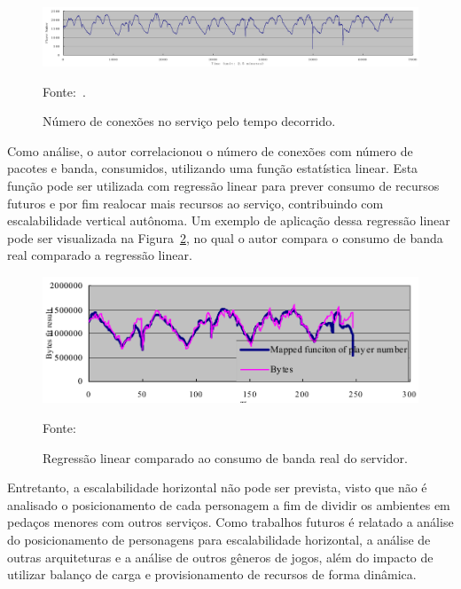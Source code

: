 \begin{figure}[htb!]
\caption{Número de conexões no serviço pelo tempo decorrido.}
\label{fig:players_peer_time}
\includegraphics[width=\textwidth]{img/cap2/players_peer_time.png}
\centering

Fonte:~\cite{1417630}.
\end{figure}



Como análise, o autor correlacionou o número de conexões com número de pacotes e banda, consumidos, utilizando uma função estatística linear.
%
Esta função pode ser utilizada com regressão linear para prever consumo de recursos futuros e por fim realocar mais recursos ao serviço, contribuindo com escalabilidade vertical autônoma.
%
Um exemplo de aplicação dessa regressão linear pode ser visualizada na Figura~\ref{fig:regressao_bytes}, no qual o autor compara o consumo de banda real comparado a regressão linear.



\begin{figure}[htb!]
\caption{Regressão linear comparado ao consumo de banda real do servidor.}
\label{fig:regressao_bytes}
\includegraphics[width=\textwidth]{img/cap2/regressao.png}
\centering

Fonte:~\cite{1417630}
\end{figure}



Entretanto, a escalabilidade horizontal não pode ser prevista, visto que não é analisado o posicionamento de cada personagem a fim de dividir os ambientes em pedaços menores com outros serviços.
%
Como trabalhos futuros é relatado a análise do posicionamento de personagens para escalabilidade horizontal, a análise de outras arquiteturas e a análise de outros gêneros de jogos, além do impacto de utilizar balanço de carga e provisionamento de recursos de forma dinâmica.



